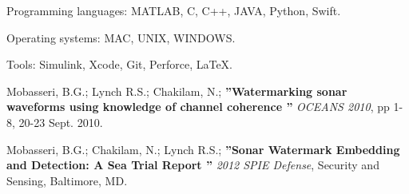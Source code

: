 \documentclass[12pt,a4paper]{article} %
\begin{document}
\inlineheadsection %
{Programming languages:}
{MATLAB, C, C++, JAVA, Python, Swift.}

\inlineheadsection %
{Operating systems:}
{MAC, UNIX, WINDOWS.}

\inlineheadsection %
{Tools:}
{Simulink, Xcode, Git, Perforce, \LaTeX.}



\spacedhrule{1.6em}{-0.4em} %



\inlineheadsection %
{Mobasseri, B.G.; Lynch R.S.; Chakilam, N.;}
{\textbf{''Watermarking sonar waveforms using knowledge of channel coherence ''} \textit{OCEANS 2010}, pp 1-8, 20-23 Sept. 2010.}

\inlineheadsection %
{Mobasseri, B.G.; Chakilam, N.; Lynch R.S.; }
{\textbf{''Sonar Watermark Embedding and Detection: A Sea Trial Report ''} \textit{2012 SPIE Defense}, Security and Sensing, Baltimore, MD.}
\end{document}
